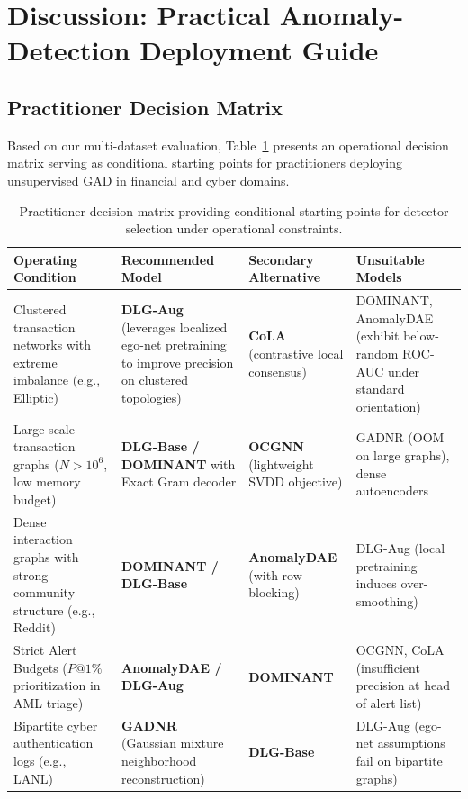 \documentclass[11pt,a4paper]{article}
\begin{document}
\section{Discussion: Practical Anomaly-Detection Deployment Guide}
\label{sec:discussion}

\subsection{Practitioner Decision Matrix}
Based on our multi-dataset evaluation, Table~\ref{tab:decision_matrix} presents an operational decision matrix serving as conditional starting points for practitioners deploying unsupervised GAD in financial and cyber domains.

\begin{table}[htbp]
\centering\footnotesize\setlength{\tabcolsep}{4pt}
\caption{Practitioner decision matrix providing conditional starting points for detector selection under operational constraints.}
\label{tab:decision_matrix}
\begin{tabularx}{\textwidth}{>{\raggedright\arraybackslash}p{}>{\raggedright\arraybackslash}X>{\raggedright\arraybackslash}X>{\raggedright\arraybackslash}p{}}\toprule
\textbf{Operating Condition} & \textbf{Recommended Model} & \textbf{Secondary Alternative} & \textbf{Unsuitable Models} \\\midrule
Clustered transaction networks with extreme imbalance (e.g., Elliptic) & \textbf{DLG-Aug} (leverages localized ego-net pretraining to improve precision on clustered topologies) & \textbf{CoLA} (contrastive local consensus) & DOMINANT, AnomalyDAE (exhibit below-random ROC-AUC under standard orientation) \\
Large-scale transaction graphs ($N > 10^6$, low memory budget) & \textbf{DLG-Base / DOMINANT} with Exact Gram decoder & \textbf{OCGNN} (lightweight SVDD objective) & GADNR (OOM on large graphs), dense autoencoders \\
Dense interaction graphs with strong community structure (e.g., Reddit) & \textbf{DOMINANT / DLG-Base} & \textbf{AnomalyDAE} (with row-blocking) & DLG-Aug (local pretraining induces over-smoothing) \\
Strict Alert Budgets ($P@1\%$ prioritization in AML triage) & \textbf{AnomalyDAE / DLG-Aug} & \textbf{DOMINANT} & OCGNN, CoLA (insufficient precision at head of alert list) \\
Bipartite cyber authentication logs (e.g., LANL) & \textbf{GADNR} (Gaussian mixture neighborhood reconstruction) & \textbf{DLG-Base} & DLG-Aug (ego-net assumptions fail on bipartite graphs) \\\bottomrule
\end{tabularx}
\end{table}
\end{document}
